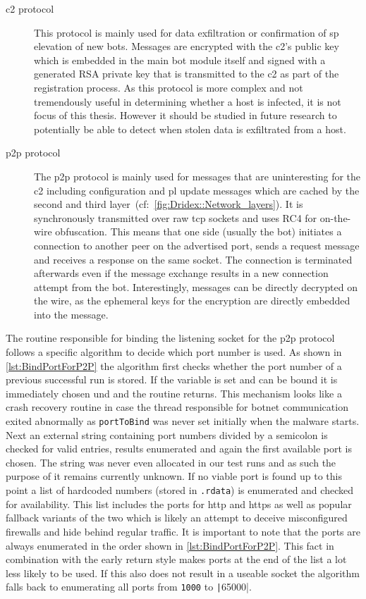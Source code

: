 \begin{description}
    \item[\gls{c2} protocol] This protocol is mainly used for data exfiltration or confirmation of \gls{sp} elevation of new \glspl{bot}.
    Messages are encrypted with the \gls{c2}'s public key which is embedded in the main \gls{bot} module itself and signed with a generated RSA private key that is transmitted to the \gls{c2} as part of the registration process.
    As this protocol is more complex and not tremendously useful in determining whether a host is infected, it is not focus of this thesis.
    However it should be studied in future research to potentially be able to detect when stolen data is exfiltrated from a host.
    \item[\gls{p2p} protocol] The \gls{p2p} protocol is mainly used for messages that are uninteresting for the \gls{c2} including configuration and \gls{pl} update messages which are cached by the second and third layer~(cf:~\autoref{fig:Dridex::Network_layers}).
    It is synchronously transmitted over raw \acrshort{tcp} sockets and uses RC4 for on-the-wire obfuscation.
    This means that one side (usually the \gls{bot}) initiates a connection to another peer on the advertised port, sends a request message and receives a response on the same socket.
    The connection is terminated afterwards even if the message exchange results in a new connection attempt from the \gls{bot}.
    Interestingly, messages can be directly decrypted on the wire, as the ephemeral keys for the encryption are directly embedded into the message.
\end{description}

The routine responsible for binding the listening socket for the \gls{p2p} protocol follows a specific algorithm to decide which port number is used.
As shown in \autoref{lst:BindPortForP2P} the algorithm first checks whether the port number of a previous successful run is stored.
If the variable is set and can be bound it is immediately chosen und and the routine returns.
This mechanism looks like a crash recovery routine in case the thread responsible for botnet communication exited abnormally as \lstinline|portToBind| was never set initially when the malware starts.
Next an external string containing port numbers divided by a semicolon is checked for valid entries, results enumerated and again the first available port is chosen.
The string was never even allocated in our test runs and as such the purpose of it remains currently unknown.
If no viable port is found up to this point a list of hardcoded numbers (stored in \lstinline|.rdata|) is enumerated and checked for availability.
This list includes the ports for \gls{http} and \gls{https} as well as popular fallback variants of the two which is likely an attempt to deceive misconfigured firewalls and hide behind regular traffic.
It is important to note that the ports are always enumerated in the order shown in \autoref{lst:BindPortForP2P}.
This fact in combination with the early return style makes ports at the end of the list a lot less likely to be used.
If this also does not result in a useable socket the algorithm falls back to enumerating all ports from \lstinline|1000| to \texttt|65000|.
\\

